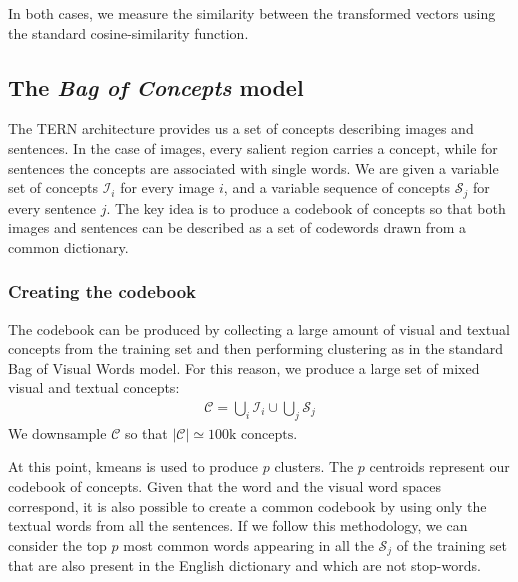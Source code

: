 \documentclass[conference]{IEEEtran}
\begin{document}
In both cases, we measure the similarity between the transformed vectors using the standard cosine-similarity function.

\subsection{The \textit{Bag of Concepts} model}

The TERN architecture provides us a set of concepts describing images and sentences. In the case of images, every salient region carries a concept, while for sentences the concepts are associated with single words.
We are given a variable set of concepts $\mathcal{I}_i$  for every image $i$, and a variable sequence of concepts $\mathcal{S}_j$ for every sentence $j$.
The key idea is to produce a codebook of concepts so that both images and sentences can be described as a set of codewords drawn from a common dictionary.

\subsubsection{Creating the codebook}

The codebook can be produced by collecting a large amount of visual and textual concepts from the training set and then performing clustering as in the standard Bag of Visual Words model.
For this reason, we produce a large set of mixed visual and textual concepts:
\begin{align*}
    \mathcal{C} = \bigcup_i \mathcal{I}_i \cup \bigcup_j \mathcal{S}_j
\end{align*}
We downsample $\mathcal{C}$ so that $|\mathcal{C}| \simeq \text{100k concepts}$.

At this point, kmeans is used to produce $p$ clusters. The $p$ centroids represent our codebook of concepts. 
Given that the word and the visual word spaces correspond, it is also possible to create a common codebook by using only the textual words from all the sentences. If we follow this methodology, we can consider the top $p$ most common words appearing in all the $\mathcal{S}_j$ of the training set that are also present in the English dictionary and which are not stop-words.
\end{document}
